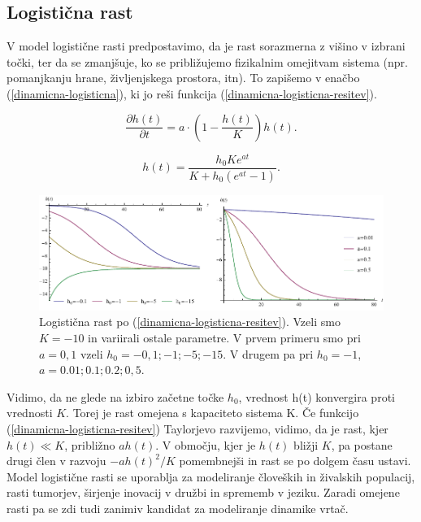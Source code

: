 \documentclass[a4paper, twoside, 12pt]{book}
\begin{document}
    \subsection{Logistična rast}

    V model logistične rasti predpostavimo, da je rast sorazmerna z višino v izbrani točki, ter da se zmanjšuje, ko se približujemo fizikalnim omejitvam sistema (npr. pomanjkanju hrane, življenjskega prostora, itn). To zapišemo v enačbo (\ref{dinamicna-logisticna}), ki jo reši funkcija (\ref{dinamicna-logisticna-resitev}).

    \begin{equation}
      \frac{\partial h(t)}{\partial t} = a \cdot \left( 1 - \frac{h(t)}{K} \right) h(t).
      \label{dinamicna-logisticna}
    \end{equation}

    \begin{equation}
      h(t) = \frac{h_0 K e^{a t}}{K + h_0 (e^{a t}-1)}.
      \label{dinamicna-logisticna-resitev}
    \end{equation}

    \begin{figure}[h]
      \begin{center}
        \includegraphics[width=14cm]{slike/logisticna-rast}
      \end{center}
      \caption{Logistična rast po (\ref{dinamicna-logisticna-resitev}). Vzeli smo $K=-10$ in variirali ostale parametre. V prvem primeru smo pri $a=0,1$ vzeli $h_0=-0,1;-1;-5;-15$. V drugem pa pri $h_0=-1$, $a=0.01;0.1;0.2;0,5$.}
      \label{fig:logisticna-rast}
    \end{figure}

    Vidimo, da ne glede na izbiro začetne točke $h_0$, vrednost h(t) konvergira proti vrednosti $K$. Torej je rast omejena s kapaciteto sistema K.
    Če funkcijo (\ref{dinamicna-logisticna-resitev}) Taylorjevo razvijemo, vidimo, da je rast, kjer $h(t) \ll K$, približno $a h(t)$. V območju, kjer je $h(t)$ bližji $K$, pa postane drugi člen v razvoju $-a h(t)^2 / K$ pomembnejši in rast se po dolgem času ustavi.
    Model logistične rasti se uporablja za modeliranje človeških in živalskih populacij, rasti tumorjev, širjenje inovacij v družbi in sprememb v jeziku. Zaradi omejene rasti pa se zdi tudi zanimiv kandidat za modeliranje dinamike vrtač.
\end{document}
